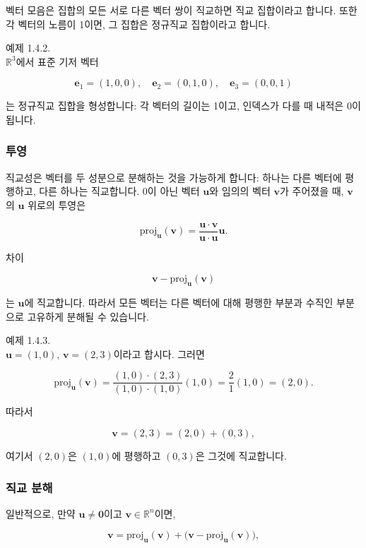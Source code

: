 \documentclass[
  12pt,
  a4paper,
]{article}
\begin{document}
벡터 모음은 집합의 모든 서로 다른 벡터 쌍이 직교하면 직교 집합이라고 합니다. 또한 각 벡터의 노름이 1이면, 그 집합은 정규직교 집합이라고 합니다.

예제 1.4.2.\\
\(\mathbb{R}^3\)에서 표준 기저 벡터

\[\mathbf{e}_1 = (1,0,0), \quad \mathbf{e}_2 = (0,1,0), \quad \mathbf{e}_3 = (0,0,1)\]

는 정규직교 집합을 형성합니다: 각 벡터의 길이는 1이고, 인덱스가 다를 때 내적은 0이 됩니다.

\subsubsection{투영}\label{projections}

직교성은 벡터를 두 성분으로 분해하는 것을 가능하게 합니다: 하나는 다른 벡터에 평행하고, 다른 하나는 직교합니다. 0이 아닌 벡터 \(\mathbf{u}\)와 임의의 벡터 \(\mathbf{v}\)가 주어졌을 때, \(\mathbf{v}\)의 \(\mathbf{u}\) 위로의 투영은

\[\text{proj}_{\mathbf{u}}(\mathbf{v}) = \frac{\mathbf{u} \cdot \mathbf{v}}{\mathbf{u} \cdot \mathbf{u}} \mathbf{u}.\]

차이

\[\mathbf{v} - \text{proj}_{\mathbf{u}}(\mathbf{v})\]

는 \(\mathbf{u}\)에 직교합니다. 따라서 모든 벡터는 다른 벡터에 대해 평행한 부분과 수직인 부분으로 고유하게 분해될 수 있습니다.

예제 1.4.3.\\
\(\mathbf{u} = (1,0)\), \(\mathbf{v} = (2,3)\)이라고 합시다. 그러면

\[\text{proj}_{\mathbf{u}}(\mathbf{v}) = \frac{(1,0)\cdot(2,3)}{(1,0)\cdot(1,0)} (1,0)
= \frac{2}{1}(1,0) = (2,0).\]

따라서

\[\mathbf{v} = (2,3) = (2,0) + (0,3),\]

여기서 \((2,0)\)은 \((1,0)\)에 평행하고 \((0,3)\)은 그것에 직교합니다.

\subsubsection{직교 분해}\label{orthogonal-decomposition}

일반적으로, 만약 \(\mathbf{u} \neq \mathbf{0}\)이고 \(\mathbf{v} \in \mathbb{R}^n\)이면,

\[\mathbf{v} = \text{proj}_{\mathbf{u}}(\mathbf{v}) + \big(\mathbf{v} - \text{proj}_{\mathbf{u}}(\mathbf{v})\big),\]
\end{document}
